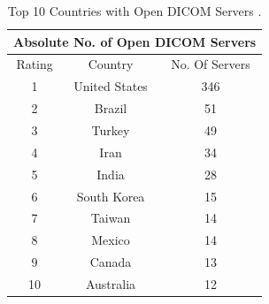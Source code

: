 \documentclass[pdf,bookmarks,colorlinks=true]{IEEEtran}
\begin{document}
\begin{table}[tbh!]
\caption{Top 10 Countries with Open DICOM Servers \cite{stites2016secure}.}
\label{tab:DICOMServers}
\centering
\begin{tabular}{|c|c|c|}
	\hline 
	\multicolumn{3}{|c|}{Absolute No. of Open DICOM Servers} \\ 
	\hline
	Rating & Country & No. Of Servers \\ 
	\hline 
	1 & United States & 346 \\ 
	\hline 
	2 & Brazil & 51 \\ 
	\hline 
	3 & Turkey & 49 \\ 
	\hline 
	4 & Iran & 34 \\ 
	\hline 
	5 & India & 28 \\ 
	\hline 
	6 & South Korea & 15 \\ 
	\hline 
	7 & Taiwan & 14 \\ 
	\hline 
	8 & Mexico & 14 \\ 
	\hline 
	9 & Canada & 13 \\ 
	\hline 
	10 & Australia & 12 \\ 
	\hline 
\end{tabular}
\end{table} 
\end{document}
